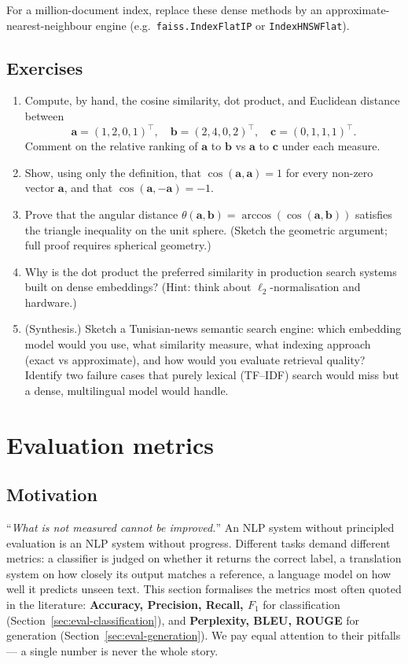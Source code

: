 \documentclass[12pt,a4paper]{report}
\theoremstyle{definition}
\theoremstyle{remark}
\begin{document}
For a million-document index, replace these dense methods by an approximate-nearest-neighbour engine (e.g.\ \texttt{faiss.IndexFlatIP} or \texttt{IndexHNSWFlat}).

\subsection{Exercises}
\begin{enumerate}
    \item Compute, by hand, the cosine similarity, dot product, and Euclidean distance between
    \[ \mathbf{a} = (1, 2, 0, 1)^\top, \quad \mathbf{b} = (2, 4, 0, 2)^\top, \quad \mathbf{c} = (0, 1, 1, 1)^\top. \]
    Comment on the relative ranking of $\mathbf{a}$ to $\mathbf{b}$ vs $\mathbf{a}$ to $\mathbf{c}$ under each measure.
    \item Show, using only the definition, that $\cos(\mathbf{a}, \mathbf{a}) = 1$ for every non-zero vector $\mathbf{a}$, and that $\cos(\mathbf{a}, -\mathbf{a}) = -1$.
    \item Prove that the angular distance $\theta(\mathbf{a}, \mathbf{b}) = \arccos(\cos(\mathbf{a}, \mathbf{b}))$ satisfies the triangle inequality on the unit sphere. (Sketch the geometric argument; full proof requires spherical geometry.)
    \item Why is the dot product the preferred similarity in production search systems built on dense embeddings? (Hint: think about $\ell_2$-normalisation and hardware.)
    \item (Synthesis.) Sketch a Tunisian-news semantic search engine: which embedding model would you use, what similarity measure, what indexing approach (exact vs approximate), and how would you evaluate retrieval quality? Identify two failure cases that purely lexical (TF--IDF) search would miss but a dense, multilingual model would handle.
\end{enumerate}

\section{Evaluation metrics}
\label{sec:eval}

\subsection{Motivation}
``\emph{What is not measured cannot be improved.}'' An NLP system without principled evaluation is an NLP system without progress. Different tasks demand different metrics: a classifier is judged on whether it returns the correct label, a translation system on how closely its output matches a reference, a language model on how well it predicts unseen text. This section formalises the metrics most often quoted in the literature: \textbf{Accuracy, Precision, Recall, $F_1$} for classification (Section~\ref{sec:eval-classification}), and \textbf{Perplexity, BLEU, ROUGE} for generation (Section~\ref{sec:eval-generation}). We pay equal attention to their pitfalls --- a single number is never the whole story.
\end{document}
